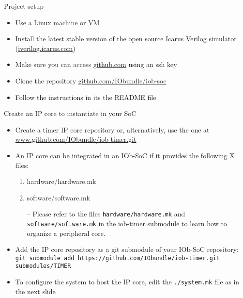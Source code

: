 \documentclass [xcolor=svgnames, t] {beamer}
\begin{document}
\begin{frame}{Project setup}
\begin{center}
  \begin{itemize}
    \item Use a Linux machine or VM
    \item Install the latest stable version of the open source Icarus Verilog simulator (\url{iverilog.icarus.com})
    \item Make sure you can access \url{github.com} using an ssh key
    \item Clone the repository \url{github.com/IObundle/iob-soc}
    \item Follow the instructions in its the README file
  \end{itemize}
\end{center}
\end{frame}


\begin{frame}{Create an IP core to instantiate in your SoC}
  \begin{itemize}
  \item Create a timer IP core repository or, alternatively, use the one at \url{www.github.com/IObundle/iob-timer.git}
  \item An IP core can be integrated in an IOb-SoC if it provides the following X files: 
    \begin{enumerate}
    \item hardware/hardware.mk
    \item software/software.mk
    \end{enumerate}
    \begin{itemize}
      \item[--] Please refer to the files {\tt hardware/hardware.mk} and {\tt software/software.mk} in the iob-timer submodule to learn how to organize a peripheral core.
    \end{itemize}
  \item Add the IP core repository as a git submodule of your IOb-SoC repository:\\
    {\tiny \tt git submodule add https://github.com/IObundle/iob-timer.git submodules/TIMER}
  \item To configure the system to host the IP core, edit the {\tt ./system.mk} file as in the next slide
  \end{itemize}
\end{frame}

\lstset{basicstyle=\ttfamily,columns=fullflexible}
\end{document}
